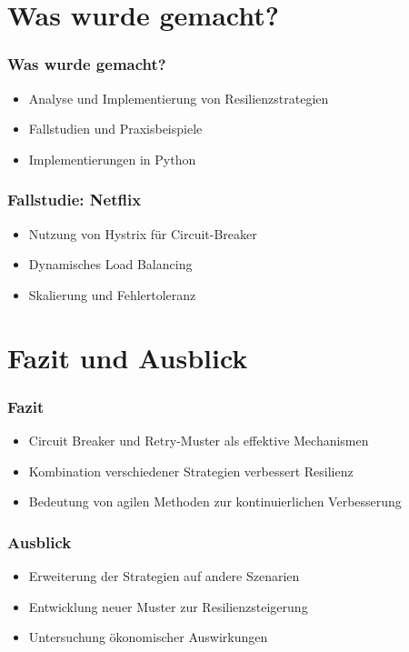 \section{Was wurde gemacht?}

\begin{frame}
    \frametitle{Was wurde gemacht?}
    \begin{itemize}
        \item Analyse und Implementierung von Resilienzstrategien
        \item Fallstudien und Praxisbeispiele
        \item Implementierungen in Python
    \end{itemize}
\end{frame}

\begin{frame}
    \frametitle{Fallstudie: Netflix}
    \begin{itemize}
        \item Nutzung von Hystrix für Circuit-Breaker
        \item Dynamisches Load Balancing
        \item Skalierung und Fehlertoleranz
    \end{itemize}
\end{frame}

\section{Fazit und Ausblick}

\begin{frame}
    \frametitle{Fazit}
    \begin{itemize}
        \item Circuit Breaker und Retry-Muster als effektive Mechanismen
        \item Kombination verschiedener Strategien verbessert Resilienz
        \item Bedeutung von agilen Methoden zur kontinuierlichen Verbesserung
    \end{itemize}
\end{frame}

\begin{frame}
    \frametitle{Ausblick}
    \begin{itemize}
        \item Erweiterung der Strategien auf andere Szenarien
        \item Entwicklung neuer Muster zur Resilienzsteigerung
        \item Untersuchung ökonomischer Auswirkungen
    \end{itemize}
\end{frame}
